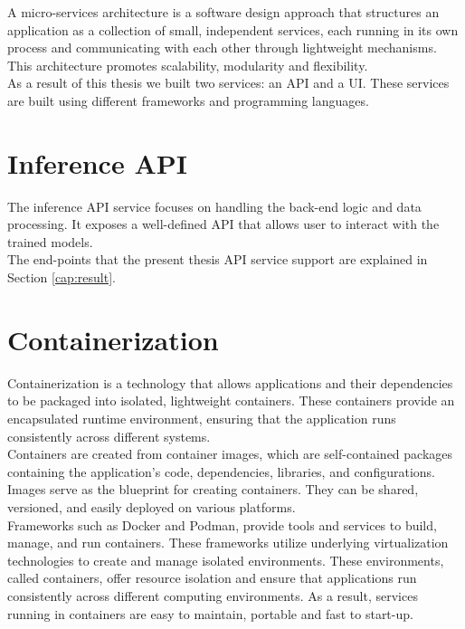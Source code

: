 A micro-services architecture is a software design approach that structures an
application as a collection of small, independent services, each running in its
own process and communicating with each other through lightweight mechanisms.
This architecture promotes scalability, modularity and flexibility. \\

As a result of this thesis we built two services: an API and a UI. These services
are built using different frameworks and programming languages.

\section{Inference API}

The inference API service focuses on handling the back-end logic and data
processing. It exposes a well-defined API that allows user to interact with the
trained models. \\

The end-points that the present thesis API service support are explained in
Section \ref{cap:result}.

\section{Containerization}

Containerization is a technology that allows applications and their
dependencies to be packaged into isolated, lightweight containers. These
containers provide an encapsulated runtime environment, ensuring that the
application runs consistently across different systems. \\

Containers are created from container images, which are self-contained packages
containing the application's code, dependencies, libraries, and configurations.
Images serve as the blueprint for creating containers. They can be shared,
versioned, and easily deployed on various platforms. \\

Frameworks such as Docker and Podman, provide tools and services to build,
manage, and run containers. These frameworks utilize underlying virtualization
technologies to create and manage isolated environments. These environments,
called containers, offer resource isolation and ensure that applications run
consistently across different computing environments. As a result, services
running in containers are easy to maintain, portable and fast to start-up.

